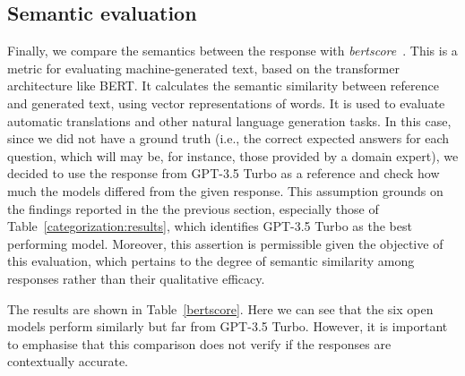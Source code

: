 \documentclass[preprint,12pt]{elsarticle}
\newcommand{\sara}[1]{{\color{red}{\textbf{[Sara]}~#1}}}
\newcommand{\gamm}[1]{{\color{green}{\textbf{[Gianlu-Matte]}~#1}}}
\begin{document}
\subsection{Semantic evaluation}



Finally, we compare the semantics between the response with \emph{bertscore}~\cite{bert-score}.
%
This is a metric for evaluating machine-generated text, based on the transformer architecture like BERT. 
%
It calculates the semantic similarity between reference and generated text, using vector representations of words. 
%
It is used to evaluate automatic translations and other natural language generation tasks.
%
In this case, since we did not have a ground truth (i.e., the correct expected answers for each question, which will may be, for instance, those provided by a domain expert), we decided to use the response from GPT-3.5 Turbo as a reference and check how much the models differed from the given response.
%
This assumption grounds on the findings reported in the the previous section, especially those of Table~\ref{categorization:results}, which identifies GPT-3.5 Turbo as the best performing model.
%
Moreover, this assertion is permissible given the objective of this evaluation, which pertains to the degree of semantic similarity among responses rather than their qualitative efficacy.

The results are shown in Table~\ref{bertscore}.
% 
Here we can see that the six open models perform similarly but far from GPT-3.5 Turbo.
%
However, it is important to emphasise that this comparison does not verify if the responses are contextually accurate. 
\end{document}
